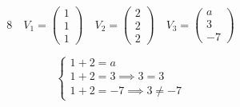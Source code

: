 \documentclass{article}
\begin{document}
\[
\text{8} \quad V_1 = \begin{pmatrix} 1 \\ 1 \\ 1 \end{pmatrix} \quad V_2 = \begin{pmatrix} 2 \\ 2 \\ 2 \end{pmatrix} \quad V_3 = \begin{pmatrix} a \\ 3 \\ -7 \end{pmatrix}
\]

\[
\begin{cases}
1 + 2 = a \\
1 + 2 = 3  \implies 3 = 3\\
1 + 2 = -7 \implies 3 \neq -7
\end{cases}
\]
\end{document}
